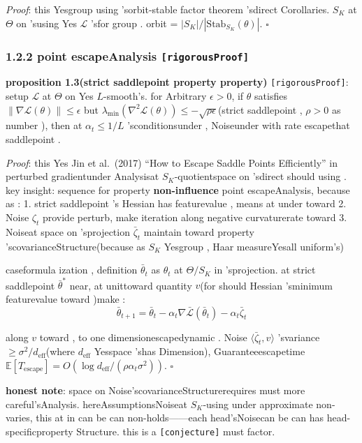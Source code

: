 \documentclass[
  12pt,
]{article}
\begin{document}
\emph{Proof}: this Yesgroup using 'sorbit-stable factor theorem 'sdirect Corollaries. \(S_K\) at 
\(\Theta\) on 'susing Yes \(\mathcal{L}\) 'sfor group . orbit =
\(|S_K| / |\text{Stab}_{S_K}(\theta)|\). \(\square\)

\subsubsection{\texorpdfstring{1.2.2 point escapeAnalysis
\texttt{{[}rigorousProof{]}}}{1.2.2 point escapeAnalysis {[}rigorousProof{]}}}\label{ux978dux70b9ux9003ux9038ux5206ux6790-ux4e25ux683cux8bc1ux660e}

\textbf{proposition 1.3(strict saddlepoint property property)} \texttt{{[}rigorousProof{]}}: setup
\(\mathcal{L}\) at  \(\Theta\) on Yes \(L\)-smooth's. for Arbitrary
\(\epsilon > 0\), if  \(\theta\) satisfies 
\(\|\nabla\mathcal{L}(\theta)\| \leq \epsilon\) but 
\(\lambda_{\min}(\nabla^2\mathcal{L}(\theta)) \leq -\sqrt{\rho\epsilon}\)(strict saddlepoint , \(\rho > 0\)
as number ), then at  \(\alpha_t \leq 1/L\)
'sconditionsunder , Noiseunder with rate escapethat saddlepoint . 

\emph{Proof}: this Yes Jin et al.~(2017) ``How to Escape Saddle Points
Efficiently'' in perturbed gradientunder Analysisat 
\(S_K\)-quotientspace on 'sdirect should using . key insight: sequence for property \textbf{non-influence }point escapeAnalysis, because as : 
1. strict saddlepoint 's Hessian has featurevalue , means at under toward  2. Noise
\(\zeta_t\) provide perturb, make iteration along negative curvaturerate toward  3. Noiseat space on 'sprojection
\(\bar{\zeta}_t\) maintain toward property 'scovarianceStructure(because as  \(S_K\) Yesgroup , Haar
measureYesall uniform's)

caseformula ization , definition  \(\bar{\theta}_t\) as  \(\theta_t\) at  \(\Theta/S_K\)
in 'sprojection. at strict saddlepoint  \(\bar{\theta}^*\) near, at unittoward quantity  \(v\)(for should 
Hessian 'sminimum featurevalue toward )make : 
\[\bar{\theta}_{t+1} = \bar{\theta}_t - \alpha_t \nabla\bar{\mathcal{L}}(\bar{\theta}_t) - \alpha_t \bar{\zeta}_t\]

along \(v\) toward , to one dimensionescapedynamic . Noise
\(\langle \bar{\zeta}_t, v \rangle\) 'svariance
\(\geq \sigma^2/d_{\text{eff}}\)(where \(d_{\text{eff}}\)
Yesspace 'shas Dimension), Guaranteeescapetime 
\(\mathbb{E}[T_{\text{escape}}] = O(\log d_{\text{eff}} / (\rho \alpha_t \sigma^2))\). \(\square\)

\textbf{honest note}: space on Noise'scovarianceStructurerequires must more careful'sAnalysis. hereAssumptionsNoiseat 
\(S_K\)-using under approximate non-varies, this at in can be can non-holds------each head'sNoisecan be can has head-specificproperty Structure. this is a
\texttt{{[}conjecture{]}} must factor. 
\end{document}
